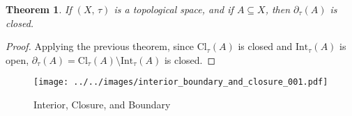 \documentclass{article}
\theoremstyle{plain}
\newtheorem{theorem}{Theorem}[section]
\theoremstyle{normal}
\begin{document}
        \begin{theorem}
            If $(X,\,\tau)$ is a topological space, and if $A\subseteq{X}$,
            then $\partial_{\tau}(A)$ is closed.
        \end{theorem}
        \begin{proof}
            Applying the previous theorem, since $\textrm{Cl}_{\tau}(A)$ is
            closed and $\textrm{Int}_{\tau}(A)$ is open,
            $\partial_{\tau}(A)=\textrm{Cl}_{\tau}(A)\setminus\textrm{Int}_{\tau}(A)$
            is closed.
        \end{proof}
        \begin{figure}
            \centering
            \texttt{[image: ../../images/interior\_boundary\_and\_closure\_001.pdf]}
            \caption{Interior, Closure, and Boundary}
            \label{fig:interior_boundary_and_closure_001}
        \end{figure}
\end{document}
